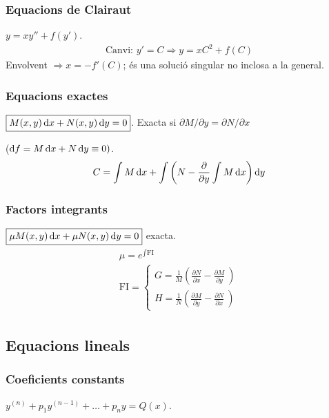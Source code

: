 \subsubsection*{Equacions de Clairaut}
$\boxed{y = xy''  + f(y')}$.
\begin{align}
    \text{Canvi: } y' = C \Rightarrow y = xC^{2} + f(C)
\end{align}
Envolvent $\Rightarrow x = - f'(C)$; és una solució singular no inclosa a la general.

\subsubsection*{Equacions exactes}
$\boxed{M(x,y) \mathop{}\!\mathrm{d} x + N(x,y) \mathop{}\!\mathrm{d} y = 0}$. Exacta si $\partial M / \partial y = \partial N / \partial x$ 

($\mathrm{d} f = M \mathop{}\!\mathrm{d} x + N \mathop{}\!\mathrm{d} y \equiv 0)$.
\begin{align}
    C = \int M \mathop{}\!\mathrm{d} x + \int \left( N - \frac{\partial}{\partial y} \int M \mathop{}\!\mathrm{d} x \right) \mathop{}\!\mathrm{d} y
\end{align}

\subsubsection*{Factors integrants}
$\boxed{\mu M(x,y) \mathop{}\!\mathrm{d} x + \mu N(x,y) \mathop{}\!\mathrm{d} y = 0}$ exacta.
\begin{align}
\begin{gathered}
    \mu = e^{\int \text{FI}} \\
    \text{FI} = \begin{cases} \displaystyle G = \frac{1}{M} \left( \frac{\partial N}{\partial x} - \frac{\partial M}{\partial y}\ \right) \\ \displaystyle H = \frac{1}{N} \left( \frac{\partial M}{\partial y} - \frac{\partial N}{\partial x}\ \right) \end{cases}
\end{gathered}
\end{align}

\subsection*{Equacions lineals}
\subsubsection*{Coeficients constants}
$\boxed{y^{(n)} + p_{1} y^{(n-1)} + \dots + p_{n}y = Q(x)}$.

